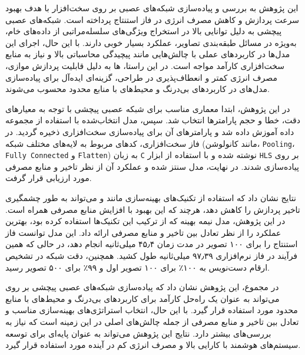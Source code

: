 

این پژوهش به بررسی و پیاده‌سازی شبکه‌های عصبی  بر روی سخت‌افزار  با هدف بهبود سرعت پردازش و کاهش مصرف انرژی در فاز استنتاج پرداخته است. شبکه‌های عصبی پیچشی به دلیل توانایی بالا در استخراج ویژگی‌های سلسله‌مراتبی از داده‌های خام، به‌ویژه در مسائل طبقه‌بندی تصاویر، عملکرد بسیار خوبی دارند. با این حال، اجرای این مدل‌ها در کاربردهای عملی با چالش‌هایی مانند پیچیدگی محاسباتی بالا و نیاز به منابع سخت‌افزاری کارآمد مواجه است. در این راستا، ‌ها به دلیل قابلیت پردازش موازی، مصرف انرژی کمتر و انعطاف‌پذیری در طراحی، گزینه‌ای ایده‌آل برای پیاده‌سازی مدل‌های  در کاربردهای بی‌درنگ و محیط‌های با منابع محدود محسوب می‌شوند.


در این پژوهش، ابتدا معماری مناسب برای شبکه عصبی پیچشی با توجه به معیارهای دقت، خطا و حجم پارامترها انتخاب شد. سپس، مدل انتخاب‌شده با استفاده از مجموعه داده  آموزش داده شد و پارامترهای آن برای پیاده‌سازی سخت‌افزاری ذخیره گردید. در فاز سخت‌افزاری، کدهای مربوط به لایه‌های مختلف شبکه (مانند کانولوشن، \texttt{Pooling}، \texttt{Fully Connected} و \texttt{Flatten}) به زبان \texttt{C} نوشته شده و با استفاده از ابزار \texttt{HLS} بر روی  پیاده‌سازی شدند. در نهایت، مدل سنتز شده و عملکرد آن از نظر تاخیر و منابع مصرفی مورد ارزیابی قرار گرفت.


نتایج نشان داد که استفاده از تکنیک‌های بهینه‌سازی مانند  و  می‌تواند به طور چشمگیری تاخیر پردازش را کاهش دهد، هرچند که این بهبود با افزایش منابع مصرفی همراه است. در این پژوهش، مدل نیمه بهینه که از ترکیب این تکنیک‌ها استفاده کرده بود، بهترین عملکرد را از نظر تعادل بین تاخیر و منابع مصرفی ارائه داد. این مدل توانست فاز استنتاج را برای ۱۰۰ تصویر در مدت زمان ۴۵٫۴ میلی‌ثانیه انجام دهد، در حالی که همین فرآیند در فاز نرم‌افزاری ۹۷٫۳۹ میلی‌ثانیه طول کشید. همچنین، دقت شبکه در تشخیص ارقام دست‌نویس به ۱۰۰٪ برای ۱۰۰ تصویر اول و ۹۹٪ برای ۵۰۰ تصویر رسید.

در مجموع، این پژوهش نشان داد که پیاده‌سازی شبکه‌های عصبی پیچشی بر روی  می‌تواند به عنوان یک راه‌حل کارآمد برای کاربردهای بی‌درنگ و محیط‌های با منابع محدود مورد استفاده قرار گیرد. با این حال، انتخاب استراتژی‌های بهینه‌سازی مناسب و تعادل بین تاخیر و منابع مصرفی از جمله چالش‌های اصلی در این زمینه است که نیاز به بررسی‌های بیشتر دارد. نتایج این پژوهش می‌تواند به عنوان پایه‌ای برای توسعه سیستم‌های هوشمند با کارایی بالا و مصرف انرژی کم در آینده مورد استفاده قرار گیرد.